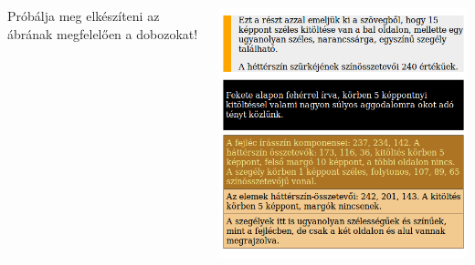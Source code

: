\begin{frame}
  \begin{columns}[c]
      Próbálja meg elkészíteni az ábrának megfelelően a dobozokat!
      \begin{center}
        \includegraphics[scale=0.35]{dobozok.png}\\
      \end{center}
  \end{columns} 
\end{frame}
